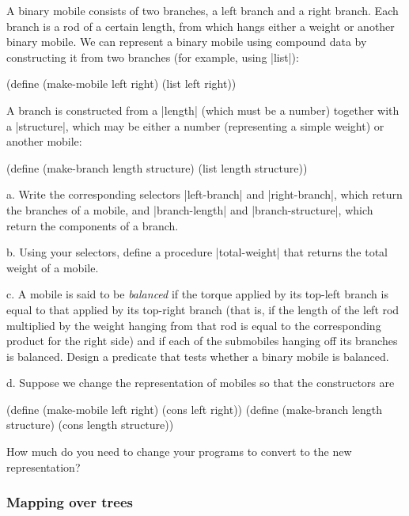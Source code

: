 \begin{Exercise}
\label{exc:2.29}
A binary mobile consists of two branches, a left branch and a right
branch.  Each branch is a rod of a certain length, from which hangs
either a weight or another binary mobile.  We can represent a binary
mobile using compound data by constructing it from two branches (for
example, using \scheme|list|):


\begin{schemedisplay}
(define (make-mobile left right)
  (list left right))
\end{schemedisplay}
A branch is constructed from a \scheme|length| (which must be a number)
together with a \scheme|structure|, which may be either a number
(representing a simple weight) or another mobile:


\begin{schemedisplay}
(define (make-branch length structure)
  (list length structure))
\end{schemedisplay}

a.  Write the corresponding selectors \scheme|left-branch| and
\scheme|right-branch|, which return the branches of a mobile, and
\scheme|branch-length| and \scheme|branch-structure|, which return 
the components of a branch.

b.  Using your selectors, define a procedure \scheme|total-weight| 
that returns the total weight of a mobile.

c.  A mobile is said to be \textit{balanced} if the torque applied
by its top-left branch is equal to that applied by its top-right
branch (that is, if the length of the left rod multiplied by the
weight hanging from that rod is equal to the corresponding product for
the right side) and if each of the submobiles hanging off its branches
is balanced. Design a predicate that tests whether a binary mobile is
balanced.

d.  Suppose we change the representation of mobiles so that the
constructors are

\begin{schemedisplay}
(define (make-mobile left right)
  (cons left right))
(define (make-branch length structure)
  (cons length structure))
\end{schemedisplay}
How much do you need to change your programs to convert to the new
representation?
\end{Exercise}

\subsubsection*{Mapping over trees}

